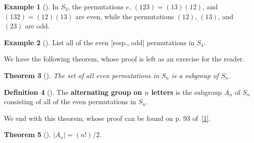 \documentclass[10pt,]{book}
\newcommand{\terminology}[1]{\textbf{#1}}
\theoremstyle{plain}
\newtheorem{theorem}{Theorem}[section]
\theoremstyle{definition}
\newtheorem{definition}[theorem]{Definition}
\theoremstyle{definition}
\theoremstyle{definition}
\newtheorem{example}[theorem]{Example}
\theoremstyle{definition}
\numberwithin{equation}{section}
\begin{document}
\begin{example}[]\label{example-59}
In \(S_3\), the permutations \(e\), \((123)=(13)(12)\), and \((132)=(12)(13)\) are even, while the permutations \((12)\), \((13)\), and \((23)\) are odd.%
\end{example}
\begin{example}[]\label{example-60}
List all of the even [resp., odd] permutations in \(S_4\).%
\end{example}
We have the following theorem, whose proof is left as an exercise for the reader.%
\begin{theorem}[{}]\label{theorem-39}
The set of all even permutations in \(S_n\) is a subgroup of \(S_n\).%
\end{theorem}
\begin{definition}[{}]\label{definition-52}
\label{notation-58}
The \terminology{alternating group on \(n\) letters} is the subgroup \(A_n\) of \(S_n\) consisting of all of the  even permutations in \(S_n\).%
\end{definition}
We end with this theorem, whose proof can be found on p. 93 of~\hyperlink{F}{[1]}.%
\begin{theorem}[{}]\label{theorem-40}
\(|A_n|=(n!)/2\).%
\end{theorem}
\typeout{************************************************}
\typeout{************************************************}
\end{document}
